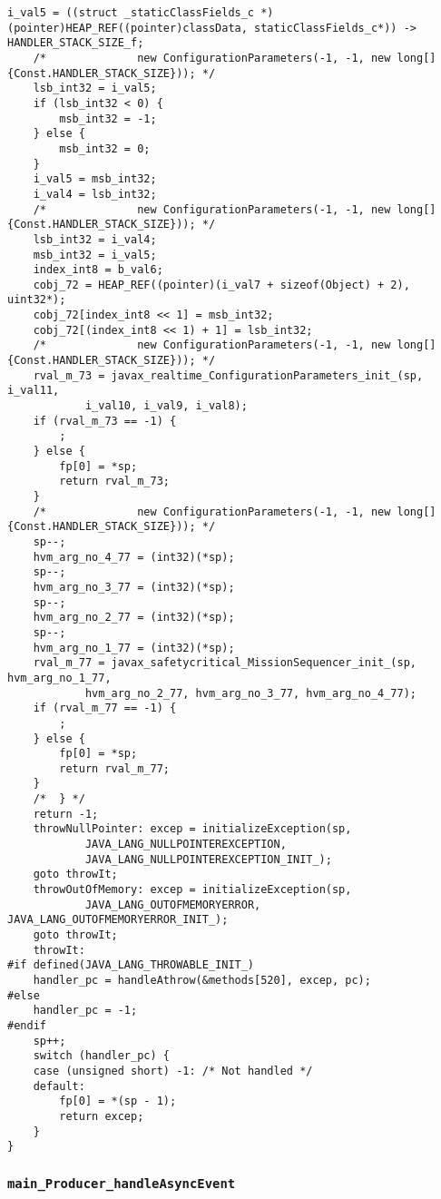 \begin{lstlisting}[firstnumber=54091]
	i_val5 = ((struct _staticClassFields_c *)(pointer)HEAP_REF((pointer)classData, staticClassFields_c*)) -> HANDLER_STACK_SIZE_f;
	/*				new ConfigurationParameters(-1, -1, new long[] {Const.HANDLER_STACK_SIZE})); */
	lsb_int32 = i_val5;
	if (lsb_int32 < 0) {
		msb_int32 = -1;
	} else {
		msb_int32 = 0;
	}
	i_val5 = msb_int32;
	i_val4 = lsb_int32;
	/*				new ConfigurationParameters(-1, -1, new long[] {Const.HANDLER_STACK_SIZE})); */
	lsb_int32 = i_val4;
	msb_int32 = i_val5;
	index_int8 = b_val6;
	cobj_72 = HEAP_REF((pointer)(i_val7 + sizeof(Object) + 2), uint32*);
	cobj_72[index_int8 << 1] = msb_int32;
	cobj_72[(index_int8 << 1) + 1] = lsb_int32;
	/*				new ConfigurationParameters(-1, -1, new long[] {Const.HANDLER_STACK_SIZE})); */
	rval_m_73 = javax_realtime_ConfigurationParameters_init_(sp, i_val11,
			i_val10, i_val9, i_val8);
	if (rval_m_73 == -1) {
		;
	} else {
		fp[0] = *sp;
		return rval_m_73;
	}
	/*				new ConfigurationParameters(-1, -1, new long[] {Const.HANDLER_STACK_SIZE})); */
	sp--;
	hvm_arg_no_4_77 = (int32)(*sp);
	sp--;
	hvm_arg_no_3_77 = (int32)(*sp);
	sp--;
	hvm_arg_no_2_77 = (int32)(*sp);
	sp--;
	hvm_arg_no_1_77 = (int32)(*sp);
	rval_m_77 = javax_safetycritical_MissionSequencer_init_(sp, hvm_arg_no_1_77,
			hvm_arg_no_2_77, hvm_arg_no_3_77, hvm_arg_no_4_77);
	if (rval_m_77 == -1) {
		;
	} else {
		fp[0] = *sp;
		return rval_m_77;
	}
	/*	} */
	return -1;
	throwNullPointer: excep = initializeException(sp,
			JAVA_LANG_NULLPOINTEREXCEPTION,
			JAVA_LANG_NULLPOINTEREXCEPTION_INIT_);
	goto throwIt;
	throwOutOfMemory: excep = initializeException(sp,
			JAVA_LANG_OUTOFMEMORYERROR, JAVA_LANG_OUTOFMEMORYERROR_INIT_);
	goto throwIt;
	throwIt:
#if defined(JAVA_LANG_THROWABLE_INIT_)
	handler_pc = handleAthrow(&methods[520], excep, pc);
#else
	handler_pc = -1;
#endif
	sp++;
	switch (handler_pc) {
	case (unsigned short) -1: /* Not handled */
	default:
		fp[0] = *(sp - 1);
		return excep;
	}
}
\end{lstlisting}

\subsubsection{\texttt{main\_Producer\_handleAsyncEvent}}

